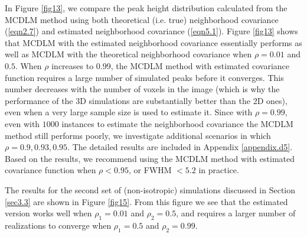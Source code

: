 \documentclass{article}
\begin{document}
In Figure \ref{fig13}, we compare the peak height distribution calculated from the MCDLM method using both theoretical (i.e. true) neighborhood covariance (\ref{eqn2.7}) and estimated neighborhood covariance (\ref{eqn5.1}). Figure \ref{fig13} shows that MCDLM with the estimated neighborhood covariance essentially performs as well as MCDLM with the theoretical neighborhood covariance when $\rho = 0.01$ and $0.5$. When $\rho$ increases to 0.99, the MCDLM method with estimated covariance function requires a large number of simulated peaks before it converges. This number decreases with the number of voxels in the image (which is why the performance of the 3D simulations are substantially better than the 2D ones), even when a very large sample size is used to estimate it. Since with $\rho = 0.99$, even with $1000$ instances to estimate the neighborhood covariance the MCDLM method still performs poorly, we investigate additional scenarios in which $\rho = 0.9, 0.93, 0.95$. The detailed results are included in Appendix \ref{appendix.d5}. Based on the results, we recommend using the MCDLM method with estimated covariance function when $\rho < 0.95$, or FWHM $< 5.2$ in practice.

The results for the second set of (non-isotropic) simulations discussed in Section \ref{sec3.3} are shown in Figure \ref{fig15}. From this figure we see that the estimated version works well when $\rho_1 = 0.01$ and $\rho_2 = 0.5$, and requires a larger number of realizations to converge when $\rho_1 = 0.5$ and $\rho_2 = 0.99$.
\end{document}
